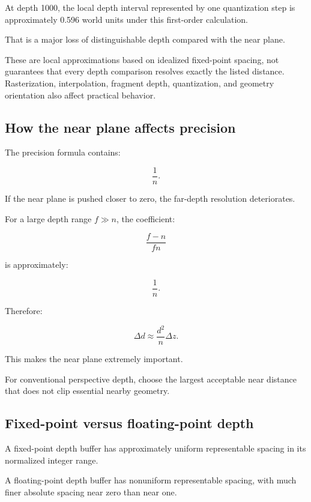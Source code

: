 At depth 1000, the local depth interval represented by one quantization step is approximately 0.596 world units under this first-order calculation.

That is a major loss of distinguishable depth compared with the near plane.

These are local approximations based on idealized fixed-point spacing, not guarantees that every depth comparison resolves exactly the listed distance. Rasterization, interpolation, fragment depth, quantization, and geometry orientation also affect practical behavior.

\subsection{How the near plane affects precision}\label{02-foundations-ii-ch033-how-the-near-plane-affects-precision}

\hypertarget{02-foundations-ii-ch033-how-the-near-plane-affects-precision}{}

The precision formula contains:

\[
 \frac1n.
\]

If the near plane is pushed closer to zero, the far-depth resolution deteriorates.

For a large depth range \(f\gg n\), the coefficient:

\[
 \frac{f-n}{fn}
\]

is approximately:

\[
 \frac1n.
\]

Therefore:

\[
 \boxed{ \Delta d\approx\frac{d^2}{n}\Delta z }.
\]

This makes the near plane extremely important.

For conventional perspective depth, choose the largest acceptable near distance that does not clip essential nearby geometry.

\subsection{Fixed-point versus floating-point depth}\label{02-foundations-ii-ch033-fixed-point-versus-floating-point-depth}

\hypertarget{02-foundations-ii-ch033-fixed-point-versus-floating-point-depth}{}

A fixed-point depth buffer has approximately uniform representable spacing in its normalized integer range.

A floating-point depth buffer has nonuniform representable spacing, with much finer absolute spacing near zero than near one.

